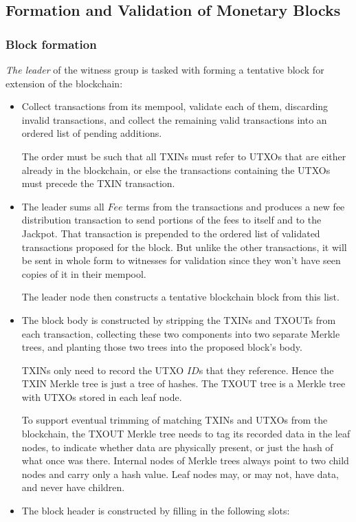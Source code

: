 \documentclass[a4paper, 10pt, conference]{ieeeconf}
\begin{document}
\subsection{Formation and Validation of Monetary Blocks}\label{block}

\subsubsection{Block formation} \textit{The leader} of the witness group is tasked with forming a tentative block for extension of the blockchain:

\begin{itemize}
	\item {Collect transactions from its mempool, validate each of them, discarding invalid transactions, and collect the remaining valid transactions into an ordered list of pending additions.

	The order must be such that all TXINs must refer to UTXOs that are either already in the blockchain, or else the transactions containing the UTXOs must precede the TXIN transaction.}
	\item {The leader sums all $Fee$ terms from the transactions and produces a new fee distribution transaction to send portions of the fees to itself and to the Jackpot. That transaction is prepended to the ordered list of validated transactions proposed for the block. But unlike the other transactions, it will be sent in whole form to witnesses for validation since they won't have seen copies of it in their mempool.

	The leader node then constructs a tentative blockchain block from this list.}
	\item {The block body is constructed by stripping the TXINs and TXOUTs from each transaction, collecting these two components into two separate Merkle trees, and planting those two trees into the proposed block's body.

	TXINs only need to record the UTXO $ID$s that they reference. Hence the TXIN Merkle tree is just a tree of hashes. The TXOUT tree is a Merkle tree with UTXOs stored in each leaf node.

	To support eventual trimming of matching TXINs and UTXOs from the blockchain, the TXOUT Merkle tree needs to tag its recorded data in the leaf nodes, to indicate whether data are physically present, or just the hash of what once was there. Internal nodes of Merkle trees always point to two child nodes and carry only a hash value. Leaf nodes may, or may not, have data, and never have children.}
	\item {The block header is constructed by filling in the following slots:

}
\end{itemize}
\end{document}
